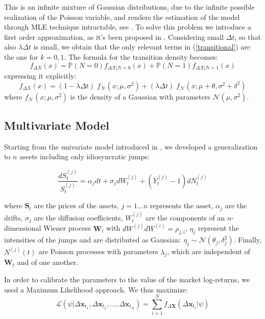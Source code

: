 This is an infinite mixture of Gaussian distributions, due to the infinite possible realization of the Poisson variable, and renders the estimation of the model through MLE technique intractable, see \cite{HONORE1998}.
To solve this problem we introduce a first order approximation, as it's been proposed in \cite{BALLTOROUS1983}. Considering small $\Delta t$, so that also $\lambda \Delta t $ is small, we obtain that the only relevant terms in (\ref{transitional}) are the one for $ k = 0, 1$.
The formula for the transition density becomes:
\begin{equation*}
f_{\Delta X} (x) = \mathbb{P}(N = 0) f_{\Delta X | N = 0}(x) + \mathbb{P}(N = 1) f_{\Delta X | N = 1}(x)
\end{equation*}
expressing it explicitly:
\begin{equation}
f_{\Delta X} (x) = (1 - \lambda \Delta t) \;f_{\mathcal{N}}(x ; \mu, \sigma^2) + (\lambda \Delta t)\; f_{\mathcal{N}}(x ; \mu + \theta, \sigma^2+\delta^2)
\end{equation}
where $f_{\mathcal{N}}(x ; \mu, \sigma^2)$ is the density of a Gaussian with parameters $\mathcal{N}(\mu, \sigma^2)$.


\subsection{Multivariate Model}
Starting from the univariate model introduced in \cite{MERTON1976}, we developed a generalization to $n$ assets including only idiosyncratic jumps:

\begin{equation}
\frac{dS_t^{(j)}}{S_t^{(j)}} = \alpha_j dt + \sigma_j dW_t^{(j)} + (Y^{(j)}_t -1) dN^{(j)}_t
\end{equation}

where $\mathbf{S}_t$ are the prices of the assets, $j = 1 ... n$ represents the asset, $\alpha_j$ are the drifts, $\sigma_j$ are the diffusion coefficients, $W^{(j)}_t$ are the components of an $n$-dimensional Wiener process $ \mathbf{W}_t$ with $dW^{(j)}dW^{(i)}=\rho_{j,i}$, $\eta_j$ represent the intensities of the jumps and are distributed as Gaussian: $\eta_j \sim \mathcal{N}(\theta_j , \delta_j^2)$. Finally, $N^{(j)}(t)$ are Poisson processes with parameters $\lambda_j$, which are independent of $\mathbf{W}_t$ and of one another. 

In order to calibrate the parameters to the value of the market log-returns, we used a Maximum Likelihood approach. We thus maximize:
\begin{equation}
\mathcal{L}(\psi | \Delta \mathbf{x}_{t_1},\Delta \mathbf{x}_{t_2},\dots,\Delta \mathbf{x}_{t_N}) = \sum_{i=1}^{N} f_{\Delta \mathbf{X}}(\Delta\mathbf{x}_{t_i} | \psi)
\end{equation}

